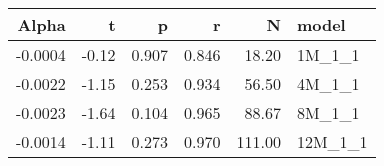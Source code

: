 \begin{table}[ht]
\centering
\begin{tabular}{rrrrrl}
  \hline
Alpha & t & p & r & N & model \\ 
  \hline
-0.0004 & -0.12 & 0.907 & 0.846 & 18.20 & 1M\_1\_1 \\ 
  -0.0022 & -1.15 & 0.253 & 0.934 & 56.50 & 4M\_1\_1 \\ 
  -0.0023 & -1.64 & 0.104 & 0.965 & 88.67 & 8M\_1\_1 \\ 
  -0.0014 & -1.11 & 0.273 & 0.970 & 111.00 & 12M\_1\_1 \\ 
   \hline
\end{tabular}
\end{table}

